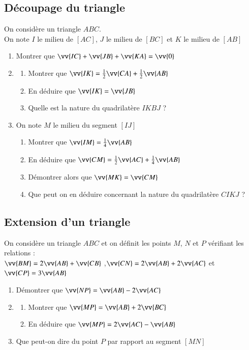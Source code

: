 \documentclass[oneside,12pt]{article}          %
\begin{document}
\subsection{Découpage du triangle}
On considère un triangle $ABC$. \\
On note $I$ le milieu de $[AC]$, $J$ le milieu de $[BC]$ et $K$ le milieu de $[AB]$ 
\begin{enumerate}
	\item Montrer que $\vv{IC}+\vv{JB}+\vv{KA}=\vv{0}$
	\item \begin{enumerate}
		\item Montrer que $\vv{IK}=\frac{1}{2}\vv{CA}+\frac{1}{2}\vv{AB}$
		\item En déduire que $\vv{IK}=\vv{JB}$
		\item Quelle est la nature du quadrilatère $IKBJ$ ?
	\end{enumerate}
	\item On note $M$ le milieu du segment $[IJ]$
	\begin{enumerate}
		\item Montrer que $\vv{IM}=\frac{1}{4}\vv{AB}$
		\item En déduire que $\vv{CM}=\frac{1}{2}\vv{AC}+\frac{1}{4}\vv{AB}$
		\item Démontrer alors que $\vv{MK}=\vv{CM}$
		\item Que peut on en déduire concernant la nature du quadrilatère $CIKJ$ ?
	\end{enumerate}
\end{enumerate}



\subsection{Extension d'un triangle}
On considère un triangle $ABC$ et on définit les points $M$, $N$ et $P$ vérifiant les relations :\\
$\vv{BM}=2\vv{AB}+\vv{CB}$ \quad ,\quad $\vv{CN}=2\vv{AB}+2\vv{AC}$ \quad et \quad $\vv{CP}=3\vv{AB}$
\begin{enumerate}
	\item Démontrer que $\vv{NP}=\vv{AB}-2\vv{AC}$
	\item \begin{enumerate}
		\item Montrer que $\vv{MP}=\vv{AB}+2\vv{BC}$
		\item En déduire que $\vv{MP}=2\vv{AC}-\vv{AB}$
	\end{enumerate}
	\item Que peut-on dire du point $P$ par rapport au segment $[MN]$
\end{enumerate}
\end{document}
